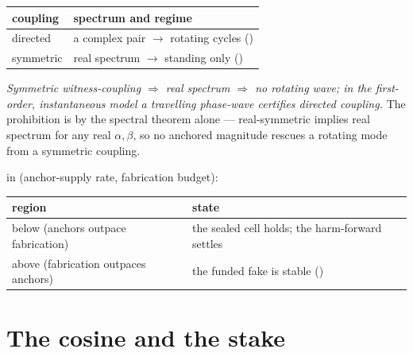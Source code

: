 \documentclass[../main]{subfiles}
\begin{document}
\begin{table}[htbp]
  \centering
  \begin{tabularx}{\textwidth}{@{} l L @{}}
    \toprule
    \textbf{coupling} & \textbf{spectrum and regime} \\
    \midrule
    directed & a complex pair $\to$ rotating cycles () \\
    symmetric & real spectrum $\to$ standing only () \\
    \bottomrule
  \end{tabularx}
\end{table}

\noindent\emph{Symmetric witness-coupling $\Rightarrow$ real spectrum $\Rightarrow$ no rotating
wave; in the first-order, instantaneous model a travelling phase-wave certifies directed
coupling.} The prohibition is  by
the spectral theorem alone --- real-symmetric implies real spectrum for any real
$\alpha,\beta$, so no anchored magnitude rescues a rotating mode from a symmetric coupling.

\medskip
{}in (anchor-supply rate,
fabrication budget):

\begin{table}[htbp]
  \centering
  \begin{tabularx}{\textwidth}{@{} l L @{}}
    \toprule
    \textbf{region} & \textbf{state} \\
    \midrule
    below (anchors outpace fabrication) & the sealed cell holds; the harm-forward settles \\
    above (fabrication outpaces anchors) & the funded fake is stable () \\
    \bottomrule
  \end{tabularx}
\end{table}

\clearpage
\section{The cosine and the stake}
\label{app:cosine}
\end{document}
